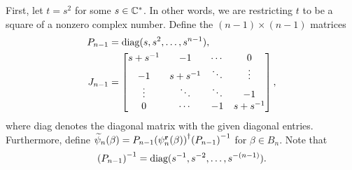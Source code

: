 First, let $t=s^2$ for some $s\in\mathbb{C}^*$. In other words, we are restricting $t$ to be a square of a nonzero complex number. Define the $(n-1)\times (n-1)$ matrices
\begin{align}
    P_{n-1} &= \textrm{diag}(s,s^2,\dots,s^{n-1}), \\
    J_{n-1} &= \begin{bmatrix}
        s+{ s }^{-1} & -1 & \cdots & 0 \\
        -1 & s+{ s }^{-1} & \ddots & \vdots \\
        \vdots & \ddots & \ddots & -1 \\
        0 & \cdots & -1 & s+{ s }^{-1}
    \end{bmatrix},
\end{align}
where diag denotes the diagonal matrix with the given diagonal entries. Furthermore, define $\widetilde{\psi}_n(\beta) = P_{n-1}{\left( \psi_n^\mathbf{r}(\beta) \right)}^\dagger{ \left( P_{n-1} \right) }^{-1}$ for $\beta\in B_n$. Note that
\begin{align*}
    { \left( P_{n-1} \right) }^{-1} = \textrm{diag}(s^{-1},s^{-2},\dots,s^{-(n-1)}).
\end{align*}


